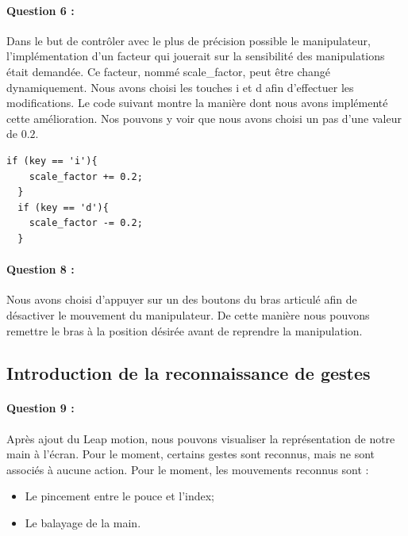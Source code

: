 \documentclass[a4paper,12pt]{article}
\begin{document}
\paragraph{Question 6 :} Dans le but de contrôler avec le plus de précision possible le manipulateur, l'implémentation d'un facteur qui jouerait sur la sensibilité des manipulations était demandée. Ce facteur, nommé \og{}scale\_factor\fg{}, peut être changé dynamiquement. Nous avons choisi les touches \og{}i\fg{} et \og{}d\fg{} afin d'effectuer les modifications. Le code suivant montre la manière dont nous avons implémenté cette amélioration. Nos pouvons y voir que nous avons choisi un pas d'une valeur de $0.2$.
\begin{lstlisting}
if (key == 'i'){
    scale_factor += 0.2;  
  }
  if (key == 'd'){
    scale_factor -= 0.2;
  }
\end{lstlisting}

\paragraph{Question 8 :} Nous avons choisi d'appuyer sur un des boutons du bras articulé afin de désactiver le mouvement du manipulateur. De cette manière nous pouvons remettre le bras à la position désirée avant de reprendre la manipulation.

\subsection{Introduction de la reconnaissance de gestes}
\paragraph{Question 9 :} Après ajout du Leap motion, nous pouvons visualiser la représentation de notre main à l'écran. Pour le moment, certains gestes sont reconnus, mais ne sont associés à aucune action. Pour le moment, les mouvements reconnus sont :
\begin{itemize}
  \item Le pincement entre le pouce et l'index;
  \item Le balayage de la main.
\end{itemize}
\end{document}
